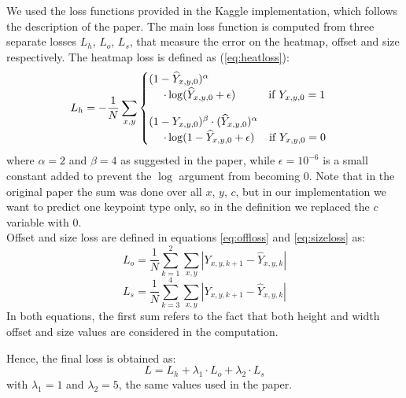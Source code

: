 We used the loss functions provided in the Kaggle implementation, which follows the description of the paper. The main loss function is computed from three separate losses $L_h$, $L_o$, $L_s$, that measure the error on the heatmap, offset and size respectively. The heatmap loss is defined as (\ref{eq:heatloss}):
\begin{gather}
\begin{aligned}
L_h=-\dfrac{1}{N}\sum_{x,y}
\begin{cases}
(1-\widehat{Y}_{x,y,0})^{\alpha} \\~~~~\cdot \log(\widehat{Y}_{x,y,0} + \epsilon)~~~~~~~~~\text{if}~Y_{x,y,0} = 1 \vspace*{10pt} \\
(1-Y_{x,y,0})^{\beta} \cdot (\widehat{Y}_{x,y,0})^\alpha \\ ~~~~\cdot \log(1-\widehat{Y}_{x,y,0} + \epsilon) ~~~~\text{if}~Y_{x,y,0}=0
\end{cases}
\end{aligned}
\label{eq:heatloss}
\raisetag{37pt}
\end{gather}
where $\alpha=2$ and $\beta=4$ as suggested in the paper, while $\epsilon=10^{-6}$ is a small constant added to prevent the $\log$ argument from becoming $0$. Note that in the original paper the sum was done over all $x$, $y$, $c$, but in our implementation we want to predict one keypoint type only, so in the definition we replaced the $c$ variable with $0$.\\
Offset and size loss are defined in equations \ref{eq:offloss} and \ref{eq:sizeloss} as:
\begin{equation}\label{eq:offloss}
L_o = \dfrac{1}{N}\sum_{k=1}^{2}\sum_{x,y}\left|Y_{x,y,k+1} - \widehat{Y}_{x,y,k}\right|
\end{equation}
\begin{equation}\label{eq:sizeloss}
	L_s = \dfrac{1}{N}\sum_{k=3}^{4}\sum_{x,y}\left|Y_{x,y,k+1} - \widehat{Y}_{x,y,k}\right|
\end{equation}
In both equations, the first sum refers to the fact that both height and width offset and size values are considered in the computation.

\noindent Hence, the final loss is obtained as:
\begin{equation}
	L=L_h+ \lambda_1 \cdot L_o+ \lambda_2 \cdot L_s
\end{equation}
with $\lambda_1=1$ and $\lambda_2=5$, the same values used in the paper.

\label{ssssec:networkarchitecturedet}

